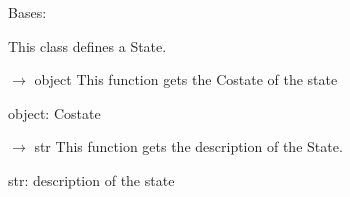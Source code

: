 \documentclass[letterpaper,10pt,english]{sphinxmanual}
\begin{document}
\begin{fulllineitems}
\label{\detokenize{scrimp:scrimp.state.State}}
\pysigstartsignatures
\pysiglinewithargsret
{}
{\sphinxparamcomma {}\sphinxparamcomma {}\sphinxparamcomma {}\sphinxparamcomma {}}
{}
\pysigstopsignatures
\sphinxAtStartPar
Bases: 

\sphinxAtStartPar
This class defines a State.

\begin{fulllineitems}
\label{\detokenize{scrimp:scrimp.state.State.get_costate}}
\pysigstartsignatures
\pysiglinewithargsret
{}
{}
{{ $\rightarrow$ object}}
\pysigstopsignatures
\sphinxAtStartPar
This function gets the Co\sphinxhyphen{}state of the state
\begin{description}
\sphinxAtStartPar
object: Costate

\end{description}

\end{fulllineitems}


\begin{fulllineitems}
\label{\detokenize{scrimp:scrimp.state.State.get_description}}
\pysigstartsignatures
\pysiglinewithargsret
{}
{}
{{ $\rightarrow$ str}}
\pysigstopsignatures
\sphinxAtStartPar
This function gets the description of the State.
\begin{description}
\sphinxAtStartPar
str: description of the state


\end{description}
\end{fulllineitems}
\end{fulllineitems}
\end{document}
